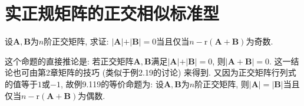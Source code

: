\documentclass[../../main.tex]{subfiles}
\begin{document}
\section{实正规矩阵的正交相似标准型}





\begin{proposition}\label{proposition:两正交矩阵的和的秩与n的差为奇数则行列式和为0}
设\(\boldsymbol{A},\boldsymbol{B}\)为\(n\)阶正交矩阵, 求证: \(\vert\boldsymbol{A}\vert+\vert\boldsymbol{B}\vert = 0\)当且仅当\(n-\mathrm{r}(\boldsymbol{A}+\boldsymbol{B})\)为奇数.
\end{proposition}
\begin{remark}
这个命题的直接推论是: 若正交矩阵\(\boldsymbol{A},\boldsymbol{B}\)满足\(\vert\boldsymbol{A}\vert+\vert\boldsymbol{B}\vert = 0\), 则\(\vert\boldsymbol{A}+\boldsymbol{B}\vert = 0\). 这一结论也可由第2章矩阵的技巧 (类似于例2.19的讨论) 来得到. 又因为正交矩阵行列式的值等于\(1\)或\(-1\), 故例9.119的等价命题为: 设\(\boldsymbol{A},\boldsymbol{B}\)为\(n\)阶正交矩阵, 则\(\vert\boldsymbol{A}\vert = \vert\boldsymbol{B}\vert\)当且仅当\(n-\mathrm{r}(\boldsymbol{A}+\boldsymbol{B})\)为偶数.
\end{remark}
\end{document}
